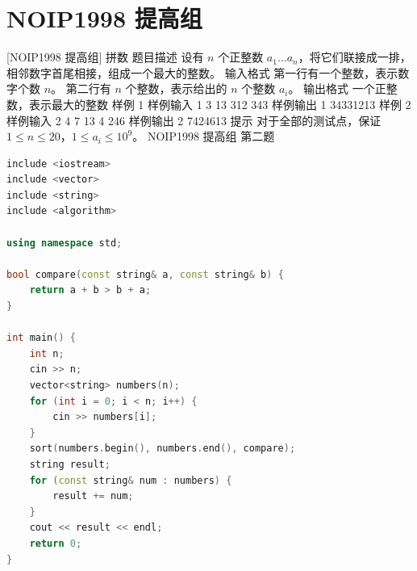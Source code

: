 \documentclass[12pt,twiside,a4paper]{ctexbook}
\numberwithin{chapter}{part}
\begin{document}
\section{NOIP1998 提高组}
 [NOIP1998 提高组] 拼数
 题目描述
设有 $n$ 个正整数 $a_1 \dots a_n$，将它们联接成一排，相邻数字首尾相接，组成一个最大的整数。
 输入格式
第一行有一个整数，表示数字个数 $n$。
第二行有 $n$ 个整数，表示给出的 $n$ 个整数 $a_i$。
 输出格式
一个正整数，表示最大的整数
 样例 1
 样例输入 1
3
13 312 343
 样例输出 1
34331213
 样例 2
 样例输入 2
4
7 13 4 246
 样例输出 2
7424613
 提示
对于全部的测试点，保证 $1 \leq n \leq 20$，$1 \leq a_i \leq 10^9$。
NOIP1998 提高组 第二题
\begin{lstlisting}[language=c++,breaklines=true]
include <iostream>
include <vector>
include <string>
include <algorithm>

using namespace std;

bool compare(const string& a, const string& b) {
    return a + b > b + a;
}

int main() {
    int n;
    cin >> n;
    vector<string> numbers(n);
    for (int i = 0; i < n; i++) {
        cin >> numbers[i];
    }
    sort(numbers.begin(), numbers.end(), compare);
    string result;
    for (const string& num : numbers) {
        result += num;
    }
    cout << result << endl;
    return 0;
}
\end{lstlisting}
\end{document}
